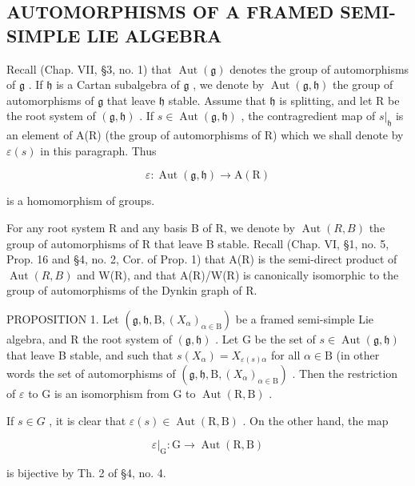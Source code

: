 \subsection{AUTOMORPHISMS OF A FRAMED SEMI-SIMPLE LIE ALGEBRA}

Recall (Chap. VII, §3, no. 1) that \(\operatorname{Aut}(\mathfrak{g})\) denotes the group of automorphisms of \(\mathfrak{g}\) . If \(\mathfrak{h}\) is a Cartan subalgebra of \(\mathfrak{g}\) , we denote by \(\operatorname{Aut}(\mathfrak{g},\mathfrak{h})\) the group of automorphisms of \(\mathfrak{g}\) that leave \(\mathfrak{h}\) stable. Assume that \(\mathfrak{h}\) is splitting, and let R be the root system of \((\mathfrak{g},\mathfrak{h})\) . If \(s\in\operatorname{Aut}(\mathfrak{g},\mathfrak{h})\) , the contragredient map of \(s|_{\mathfrak{h}}\) is an element of A(R) (the group of automorphisms of R) which we shall denote by \(\varepsilon(s)\) in this paragraph. Thus

\[
\varepsilon : \operatorname{Aut} (\mathfrak {g}, \mathfrak {h}) \to \mathrm{A} (\mathrm{R})
\]

is a homomorphism of groups.

For any root system R and any basis B of R, we denote by \(\operatorname{Aut}(R,B)\) the group of automorphisms of R that leave B stable. Recall (Chap. VI, §1, no. 5, Prop. 16 and §4, no. 2, Cor. of Prop. 1) that A(R) is the semi-direct product of \(\operatorname{Aut}(R,B)\) and W(R), and that A(R)/W(R) is canonically isomorphic to the group of automorphisms of the Dynkin graph of R.

PROPOSITION 1. Let \((\mathfrak{g},\mathfrak{h},\mathrm{B},(X_{\alpha})_{\alpha \in \mathrm{B}})\) be a framed semi-simple Lie algebra, and R the root system of \((\mathfrak{g},\mathfrak{h})\) . Let G be the set of \(s\in \operatorname {Aut}(\mathfrak{g},\mathfrak{h})\) that leave B stable, and such that \(s(X_{\alpha}) = X_{\varepsilon (s)\alpha}\) for all \(\alpha \in \mathrm{B}\) (in other words the set of automorphisms of \((\mathfrak{g},\mathfrak{h},\mathrm{B},(X_{\alpha})_{\alpha \in \mathrm{B}})\) . Then the restriction of \(\varepsilon\) to \(\mathrm{G}\) is an isomorphism from \(\mathrm{G}\) to \(\operatorname {Aut}(\mathrm{R},\mathrm{B})\) .

If \(s \in G\) , it is clear that \(\varepsilon(s) \in \operatorname{Aut}(\mathrm{R}, \mathrm{B})\) . On the other hand, the map

\[
\varepsilon|_{\mathrm{G}}: \mathrm{G} \rightarrow \operatorname{Aut} (\mathrm{R}, \mathrm{B})
\]

is bijective by Th. 2 of §4, no. 4.

